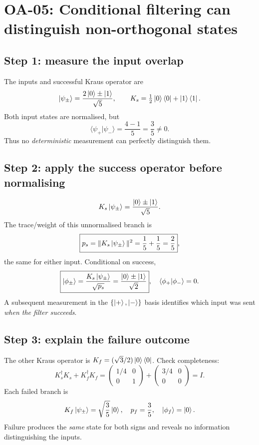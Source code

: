 
\section{OA-05: Conditional filtering can distinguish non-orthogonal states}
\subsection*{Step 1: measure the input overlap}
The inputs and successful Kraus operator are
\[
\left\lvert \psi_\pm\right\rangle=\frac{2\left\lvert 0\right\rangle\pm\left\lvert 1\right\rangle}{\sqrt5},\qquad
K_s=\tfrac12\left\lvert 0\right\rangle\left\langle 0\right\rvert+\left\lvert 1\right\rangle\left\langle 1\right\rvert .
\]
Both input states are normalised, but
\[
\boxed{\langle\psi_+|\psi_-\rangle
=\frac{4-1}{5}=\frac35\ne0}.
\]
Thus no \emph{deterministic} measurement can perfectly
distinguish them.

\subsection*{Step 2: apply the success operator before normalising}
\[
K_s\left\lvert \psi_\pm\right\rangle=\frac{\left\lvert 0\right\rangle\pm\left\lvert 1\right\rangle}{\sqrt5}.
\]
The trace/weight of this unnormalised branch is
\[
\boxed{p_s=\|K_s\left\lvert \psi_\pm\right\rangle\|^2
=\frac15+\frac15=\frac25},
\]
the same for either input. Conditional on success,
\[
\boxed{\left\lvert \phi_\pm\right\rangle=
\frac{K_s\left\lvert \psi_\pm\right\rangle}{\sqrt{p_s}}
=\frac{\left\lvert 0\right\rangle\pm\left\lvert 1\right\rangle}{\sqrt2}},
\quad
\langle\phi_+|\phi_-\rangle=0 .
\]
A subsequent measurement in the \(\{\left\lvert +\right\rangle,\left\lvert -\right\rangle\}\) basis
identifies which input was sent \emph{when the filter succeeds}.

\subsection*{Step 3: explain the failure outcome}
The other Kraus operator is
\(K_f=(\sqrt3/2)\left\lvert 0\right\rangle\left\langle 0\right\rvert\).
Check completeness:
\[
K_s^\dagger K_s+K_f^\dagger K_f
=\begin{pmatrix}1/4&0\\0&1\end{pmatrix}
+\begin{pmatrix}3/4&0\\0&0\end{pmatrix}=I.
\]
Each failed branch is
\[
K_f\left\lvert \psi_\pm\right\rangle=\sqrt{\frac35}\left\lvert 0\right\rangle,
\quad p_f=\frac35,\quad
\left\lvert \phi_f\right\rangle=\left\lvert 0\right\rangle.
\]
Failure produces the \emph{same} state for both signs
and reveals no information distinguishing the inputs.
